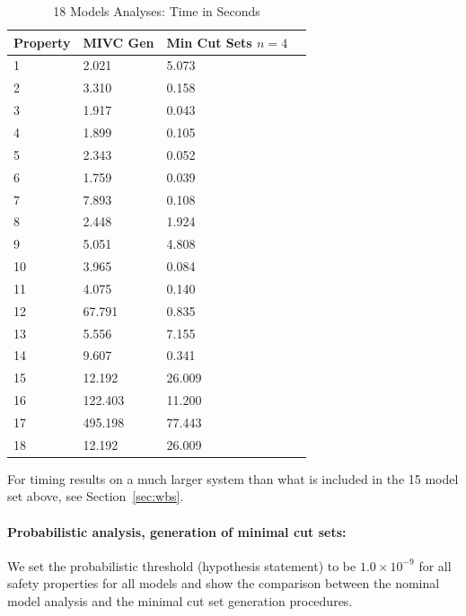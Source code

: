 

\begin{table}[htbp]
\begin{center}
    \begin{tabular}{ | l | l | l | l |}
    \hline
    \textbf{Property} & MIVC Gen & Min Cut Sets $n=4$     \\ \hline \hline
    1 & 2.021 & 5.073   \\ \hline
    2 & 3.310 & 0.158  \\ \hline
    3 & 1.917 & 0.043  \\ \hline
    4 & 1.899 & 0.105   \\ \hline
    5 & 2.343 & 0.052   \\ \hline
    6 & 1.759 & 0.039    \\ \hline
    7 & 7.893 & 0.108   \\ \hline
    8 & 2.448 & 1.924  \\ \hline
    9 & 5.051 & 4.808  \\ \hline
    10 & 3.965 & 0.084   \\ \hline
    11 & 4.075 & 0.140    \\ \hline
    12 & 67.791 & 0.835   \\ \hline
    13 & 5.556 & 7.155  \\ \hline
    14 & 9.607 & 0.341   \\ \hline
    15 & 12.192 & 26.009  \\ \hline
    16 & 122.403 & 11.200  \\ \hline
    17 & 495.198 & 77.443  \\ \hline
    18 & 12.192 & 26.009  \\ \hline
    \end{tabular}
    \caption{18 Models Analyses: Time in Seconds}
    \label{tab:wbs_mincut}
    \end{center}
\end{table}



For timing results on a much larger system than what is included in the 15 model set above, see Section~\ref{sec:wbs}. 

\paragraph{Probabilistic analysis, generation of minimal cut sets:} We set the probabilistic threshold (hypothesis statement) to be $1.0 \times 10^{-9}$ for all safety properties for all models and show the comparison between the nominal model analysis and the minimal cut set generation procedures. 

